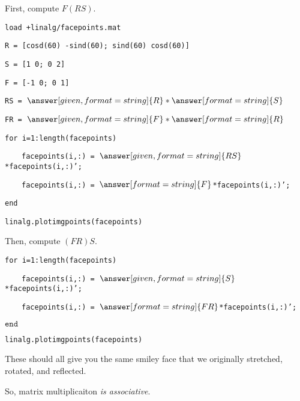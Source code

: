 \documentclass{ximera}
\begin{document}
\begin{exploration}
\begin{example}
        First, compute $F(RS)$.

        \vspace{1cm}


\texttt{load +linalg/face\textunderscore points.mat}

\texttt{R = [cosd(60) -sind(60); sind(60) cosd(60)]}

\texttt{S = [1 0; 0 2]}

\texttt{F = [-1 0; 0 1]}

\texttt{RS = }$\answer[given,format=string]{R}*\answer[format=string]{S}$

\texttt{FR = }$\answer[given,format=string]{F}*\answer[format=string]{R}$

\texttt{for i=1:length(face\textunderscore points)}

$\qquad $\texttt{face\textunderscore points(i,:) = }$\answer[given,format=string]{RS}$\texttt{*face\textunderscore points(i,:)';}

$\qquad $\texttt{face\textunderscore points(i,:) = }$\answer[format=string]{F}$\texttt{*face\textunderscore points(i,:)';}

\texttt{end}

\texttt{linalg.plot\textunderscore img\textunderscore points(face\textunderscore points)}

\vspace{1cm}

        Then, compute $(FR)S$.

        \vspace{1cm}

\texttt{for i=1:length(face\textunderscore points)}

$\qquad $\texttt{face\textunderscore points(i,:) = }$\answer[given,format=string]{S}$\texttt{*face\textunderscore points(i,:)';}

$\qquad $\texttt{face\textunderscore points(i,:) = }$\answer[format=string]{FR}$\texttt{*face\textunderscore points(i,:)';}

$\texttt{end}$

\texttt{linalg.plot\textunderscore img\textunderscore points(face\textunderscore points)}

\vspace{1cm}

These should all give you the same smiley face that we originally stretched, rotated, and reflected.

So, matrix multiplicaiton \emph{is associative}.

    \end{example}

\end{exploration}
\end{document}
